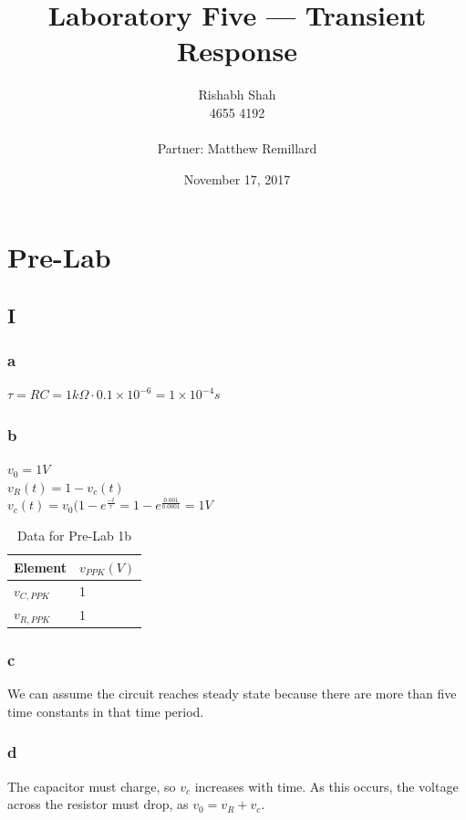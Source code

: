 \documentclass[10pt]{article}
\begin{document}
\title{Laboratory Five --- Transient Response}
\date{November 17, 2017}
\author{Rishabh Shah\\ 4655 4192\\ \\ Partner: Matthew Remillard}
\maketitle
\newpage

\section*{Pre-Lab}
\subsection*{I}
\subsubsection*{a}
$\tau = RC = 1k\Omega \cdot 0.1 \times 10^{-6} = 1 \times 10^{-4} s$

\subsubsection*{b}
$v_0 = 1V$\\
$v_R(t) = 1 -v_c(t)$\\
$v_c(t) = v_0(1-e^{\frac{-t}{\tau}} = 1-e^{\frac{0.001}{0.0001}} = 1V$\\
\begin{table}[H]
	\centering
	\begin{tabular}{ll}
		\hline
		Element & $v_{PPK} (V)$\\
		\hline
		$v_{C,PPK}$ & 1\\
		$v_{R,PPK}$ & 1\\
		\hline
	\end{tabular}
	\caption{Data for Pre-Lab 1b}
\end{table}

\subsubsection*{c}
\noindent We can assume the circuit reaches steady state because there are more than five time constants in that time period.

\subsubsection*{d}
\noindent The capacitor must charge, so $v_c$ increases with time. As this occurs, the voltage across the resistor must drop, as $v_0 = v_R + v_c$.
\end{document}
